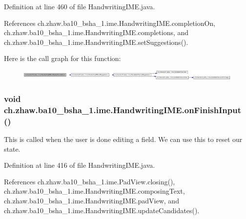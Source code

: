 Definition at line 460 of file HandwritingIME.java.

References ch.zhaw.ba10\_\-bsha\_\-1.ime.HandwritingIME.completionOn, ch.zhaw.ba10\_\-bsha\_\-1.ime.HandwritingIME.completions, and ch.zhaw.ba10\_\-bsha\_\-1.ime.HandwritingIME.setSuggestions().

Here is the call graph for this function:\nopagebreak
\begin{figure}[H]
\begin{center}
\leavevmode
\includegraphics[width=420pt]{classch_1_1zhaw_1_1ba10__bsha__1_1_1ime_1_1HandwritingIME_a5e02e524ed9e962644d630cc0facda16_cgraph}
\end{center}
\end{figure}
\hypertarget{classch_1_1zhaw_1_1ba10__bsha__1_1_1ime_1_1HandwritingIME_a1b167f4b94b905a354b0713f15ef4a92}{
\subsubsection[{onFinishInput}]{\setlength{\rightskip}{0pt plus 5cm}void ch.zhaw.ba10\_\-bsha\_\-1.ime.HandwritingIME.onFinishInput ()}}
\label{classch_1_1zhaw_1_1ba10__bsha__1_1_1ime_1_1HandwritingIME_a1b167f4b94b905a354b0713f15ef4a92}
This is called when the user is done editing a field. We can use this to reset our state. 

Definition at line 416 of file HandwritingIME.java.

References ch.zhaw.ba10\_\-bsha\_\-1.ime.PadView.closing(), ch.zhaw.ba10\_\-bsha\_\-1.ime.HandwritingIME.composingText, ch.zhaw.ba10\_\-bsha\_\-1.ime.HandwritingIME.padView, and ch.zhaw.ba10\_\-bsha\_\-1.ime.HandwritingIME.updateCandidates().

